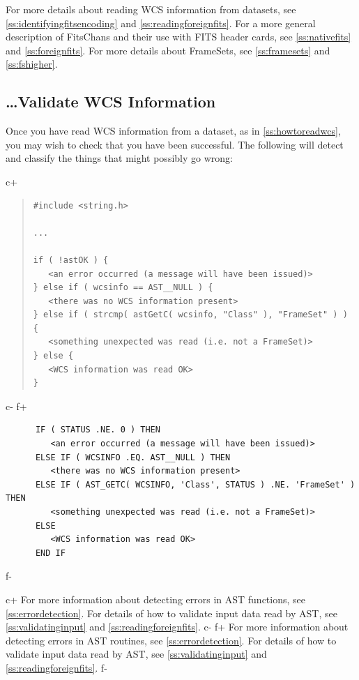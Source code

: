 \documentclass[twoside,11pt]{article}
\newcommand{\secref}[1]{\S\ref{#1}}
\renewcommand{\secref}[1]{\ref{#1}}
\begin{document}
For more details about reading WCS information from datasets, see
\secref{ss:identifyingfitsencoding} and
\secref{ss:readingforeignfits}. For a more general description of
FitsChans and their use with FITS header cards, see
\secref{ss:nativefits} and \secref{ss:foreignfits}. For more details
about FrameSets, see \secref{ss:framesets} and \secref{ss:fshigher}.

\subsection{\ldots Validate WCS Information}

Once you have read WCS information from a dataset, as in
\secref{ss:howtoreadwcs}, you may wish to check that you have been
successful. The following will detect and classify the things that
might possibly go wrong:

c+
\begin{quote}
\small
\begin{verbatim}
#include <string.h>

...

if ( !astOK ) {
   <an error occurred (a message will have been issued)>
} else if ( wcsinfo == AST__NULL ) {
   <there was no WCS information present>
} else if ( strcmp( astGetC( wcsinfo, "Class" ), "FrameSet" ) ) {
   <something unexpected was read (i.e. not a FrameSet)>
} else {
   <WCS information was read OK>
}
\end{verbatim}
\normalsize
\end{quote}
c-
f+
\small
\begin{verbatim}
      IF ( STATUS .NE. 0 ) THEN
         <an error occurred (a message will have been issued)>
      ELSE IF ( WCSINFO .EQ. AST__NULL ) THEN
         <there was no WCS information present>
      ELSE IF ( AST_GETC( WCSINFO, 'Class', STATUS ) .NE. 'FrameSet' ) THEN
         <something unexpected was read (i.e. not a FrameSet)>
      ELSE
         <WCS information was read OK>
      END IF
\end{verbatim}
\normalsize
f-

c+
For more information about detecting errors in AST functions, see
\secref{ss:errordetection}. For details of how to validate input data
read by AST, see \secref{ss:validatinginput} and
\secref{ss:readingforeignfits}.
c-
f+
For more information about detecting errors in AST routines, see
\secref{ss:errordetection}. For details of how to validate input data
read by AST, see \secref{ss:validatinginput} and
\secref{ss:readingforeignfits}.
f-
\end{document}
